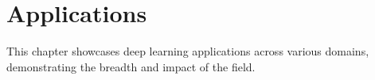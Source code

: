 
\chapter{Applications}
\label{chap:applications}

This chapter showcases deep learning applications across various domains, demonstrating the breadth and impact of the field.









